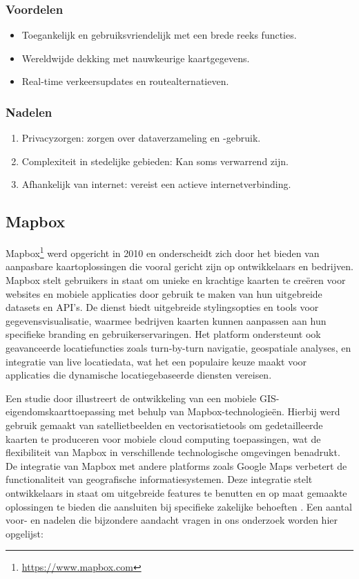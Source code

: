 \subsubsection*{Voordelen}
\begin{itemize}
    \item Toegankelijk en gebruiksvriendelijk met een brede reeks functies.
    \item Wereldwijde dekking met nauwkeurige kaartgegevens.
    \item Real-time verkeersupdates en routealternatieven.
\end{itemize}
\subsubsection*{Nadelen}
\begin{enumerate}
    \item Privacyzorgen: zorgen over dataverzameling en -gebruik.
    \item Complexiteit in stedelijke gebieden: Kan soms verwarrend zijn.
    \item Afhankelijk van internet: vereist een actieve internetverbinding.
\end{enumerate}

\subsection{Mapbox}
Mapbox\footnote{\url{https://www.mapbox.com}} werd opgericht in 2010 en onderscheidt zich door het bieden van aanpasbare kaartoplossingen die vooral gericht zijn op ontwikkelaars en bedrijven. Mapbox stelt gebruikers in staat om unieke en krachtige kaarten te creëren voor websites en mobiele applicaties door gebruik te maken van hun uitgebreide datasets en API's. De dienst biedt uitgebreide stylingsopties en tools voor gegevensvisualisatie, waarmee bedrijven kaarten kunnen aanpassen aan hun specifieke branding en gebruikerservaringen. Het platform ondersteunt ook geavanceerde locatiefuncties zoals turn-by-turn navigatie, geospatiale analyses, en integratie van live locatiedata, wat het een populaire keuze maakt voor applicaties die dynamische locatiegebaseerde diensten vereisen. 

Een studie door \textcite{Neene2017} illustreert de ontwikkeling van een mobiele GIS-eigendomskaarttoepassing met behulp van Mapbox-technologieën. Hierbij werd gebruik gemaakt van satellietbeelden en vectorisatietools om gedetailleerde kaarten te produceren voor mobiele cloud computing toepassingen, wat de flexibiliteit van Mapbox in verschillende technologische omgevingen benadrukt. De integratie van Mapbox met andere platforms zoals Google Maps verbetert de functionaliteit van geografische informatiesystemen. Deze integratie stelt ontwikkelaars in staat om uitgebreide features te benutten en op maat gemaakte oplossingen te bieden die aansluiten bij specifieke zakelijke behoeften \autocite{Hidayatulloh2023}. Een aantal voor- en nadelen die bijzondere aandacht vragen in ons onderzoek worden hier opgelijst:

